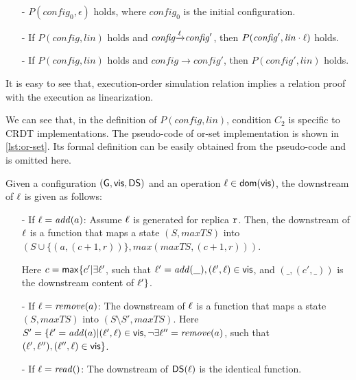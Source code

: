 \begin{itemize}
\setlength{\itemsep}{0.5pt}
\item[-] $P(\mathit{config}_0,\epsilon)$ holds, where $\mathit{config}_0$ is the initial configuration.

\item[-] If $P(\mathit{config},\mathit{lin})$ holds and $\mathit{config} {\xrightarrow{\alabel}} \mathit{config}'$, then $P(\mathit{config}', \mathit{lin} \cdot \alabel)$ holds.

\item[-] If $P(\mathit{config},\mathit{lin})$ holds and $\mathit{config} {\xrightarrow{}} \mathit{config}'$, then $P(\mathit{config}',\mathit{lin})$ holds.
\end{itemize}

It is easy to see that, execution-order simulation relation implies a \crdtlinearizable{} relation proof with the execution as linearization.

We can see that, in the definition of $P(\mathit{config},\mathit{lin})$, condition $C_2$ is specific to CRDT implementations. The pseudo-code of or-set implementation is shown in \autoref{lst:or-set}. Its formal definition can be easily obtained from the pseudo-code and is omitted here.

\begin{example}
\label{example:condition c2 for or-set implementation}
Given a configuration $(\gstates, \avisord, \downstreams)$ and an operation $\alabel \in \dom{\avisord}$, the downstream of $\alabel$ is given as follows: 

\begin{itemize}
\setlength{\itemsep}{0.5pt}
\item[-] If $\alabel = \alabellongNoret[\mathit{add}]{\argv}$: Assume $\alabel$ is generated for replica $\arep$. Then, the downstream of $\alabel$ is a function that maps a state $(S,\mathit{maxTS})$ into $(S \cup \{ (a,(c+1,r)) \}, \mathit{max}(\mathit{maxTS},(c+1,r)))$.  
    
    Here $c = \mathsf{max}\{ c' \vert \exists \alabel'$, such that $\alabel' = \alabellongNoret[\mathit{add}]{\_}, (\alabel', \alabel) \in \avisord$, and $(\_,(c',\_))$ is the downstream content of $\alabel' \}$. 

\item[-] If $\alabel = \alabellongNoret[\mathit{remove}]{\argv}$: The downstream of $\alabel$ is a function that maps a state $(S,\mathit{maxTS})$ into $(S \setminus S', \mathit{maxTS})$. 
    Here $S' = \{ \alabel' = \alabellongNoret[\mathit{add}]{\argv} \vert (\alabel',\alabel) \in \avisord, \neg \exists \alabel'' = \alabellongNoret[\mathit{remove}]{\argv}$, such that $(\alabel',\alabel''), (\alabel'',\alabel) \in \avisord \}$. 

\item[-] If $\alabel = \alabellongNoret[\mathit{read}]{}$: The downstream of $\downstreams(\alabel)$ is the identical function. 
\end{itemize}
\end{example}


